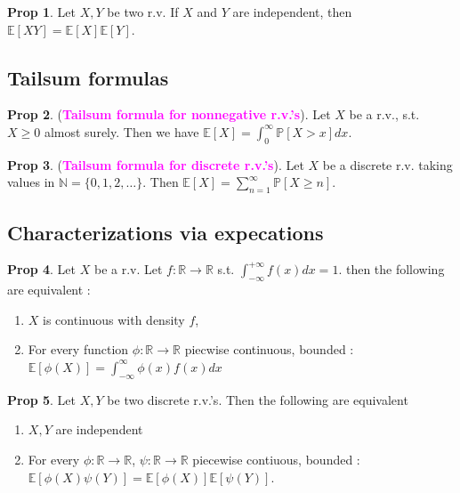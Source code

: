 \documentclass[8pt,a4paper,landscape]{article}
\theoremstyle{definition}
\theoremstyle{example}
\theoremstyle{intuition}
\theoremstyle{definition}
\newtheorem{proposition}{Prop}[section]
\newcommand{\mydef}[1]{\textcolor{magenta}{\textbf{#1}}}
\newcommand{\prob}[1]{\mathbb{P}\left[ #1 \right]}
\newcommand{\expec}[1]{\mathbb{E}\left[ #1 \right]}
\begin{document}
\begin{multicols}{3}
			\begin{proposition}
				Let $X,Y$ be two r.v. If $X$ and $Y$ are independent, then $\expec{XY} = \expec{X} \expec{Y}$.
			\end{proposition}


		\subsection{Tailsum formulas}
			\begin{proposition}
				(\mydef{Tailsum formula for nonnegative r.v.'s}). Let $X$ be a r.v., s.t. $X \geq 0$ almost surely. Then we have $\expec{X} = \int_0^\infty \prob{X > x} dx$.
			\end{proposition}

			\begin{proposition}
				(\mydef{Tailsum formula for discrete r.v.'s}). Let $X$ be a discrete r.v. taking values in $\mathbb{N} = \{0,1,2,\ldots\}$. Then
				$
					\expec{X} = \sum_{n=1}^\infty \prob{X \geq n}
				$.
			\end{proposition}


		\subsection{Characterizations via expecations}
			\begin{proposition}
				Let $X$ be a r.v. Let $f : \mathbb{R} \to \mathbb{R}$ s.t. $\int_{-\infty}^{+\infty} f(x) dx = 1$. then the following are equivalent :
				\begin{enumerate}[label=\roman*.]
					\item $X$ is continuous with density $f$,
					\item For every function $\phi : \mathbb{R} \to \mathbb{R}$ piecwise continuous, bounded : $\expec{\phi(X)} = \int_{-\infty}^\infty \phi(x) f(x) dx$
				\end{enumerate}
			\end{proposition}

			\begin{proposition}
				Let $X,Y$ be two discrete r.v.'s. Then the following are equivalent 
				\begin{enumerate}[label=\roman*.]
					\item $X,Y$ are independent
					\item For every $\phi : \mathbb{R} \to \mathbb{R}$, $\psi : \mathbb{R} \to \mathbb{R}$ piecewise contiuous, bounded : $\expec{\phi(X)\psi(Y)} = \expec{\phi(X)} \expec{\psi(Y)}$.
				\end{enumerate}
			\end{proposition}


\end{multicols}
\end{document}
